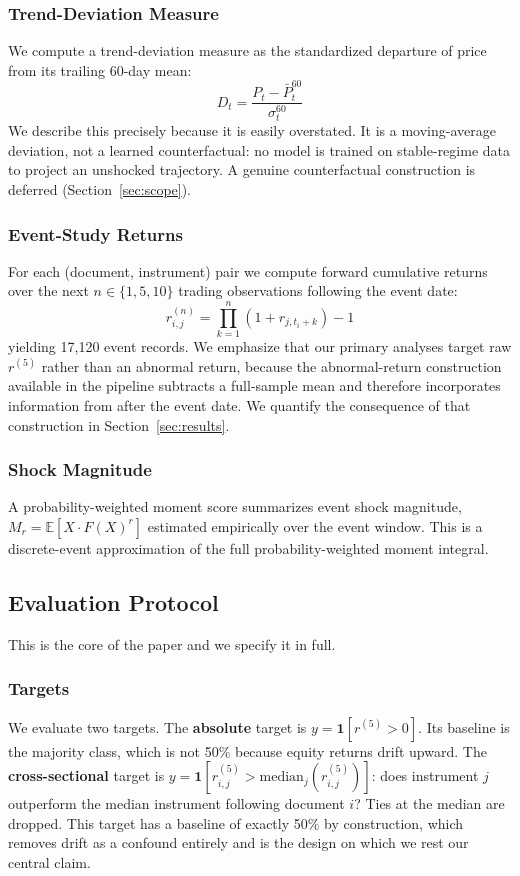 \documentclass[11pt]{article}
\begin{document}
\subsubsection{Trend-Deviation Measure}
We compute a trend-deviation measure as the standardized departure of price from its trailing 60-day mean:
\begin{equation}
D_t = \frac{P_t - \bar{P}^{60}_t}{\sigma^{60}_t}
\label{eq:cptmf}
\end{equation}
We describe this precisely because it is easily overstated. It is a moving-average deviation, not a learned counterfactual: no model is trained on stable-regime data to project an unshocked trajectory. A genuine counterfactual construction is deferred (Section~\ref{sec:scope}).

\subsubsection{Event-Study Returns}
For each (document, instrument) pair we compute forward cumulative returns over the next $n \in \{1, 5, 10\}$ trading observations following the event date:
\begin{equation}
r^{(n)}_{i,j} = \prod_{k=1}^{n}(1 + r_{j, t_i + k}) - 1
\label{eq:fwd}
\end{equation}
yielding 17{,}120 event records. We emphasize that our primary analyses target raw $r^{(5)}$ rather than an abnormal return, because the abnormal-return construction available in the pipeline subtracts a full-sample mean and therefore incorporates information from after the event date. We quantify the consequence of that construction in Section~\ref{sec:results}.

\subsubsection{Shock Magnitude}
A probability-weighted moment score summarizes event shock magnitude, $M_r = \mathbb{E}[X \cdot F(X)^r]$ estimated empirically over the event window. This is a discrete-event approximation of the full probability-weighted moment integral.

\subsection{Evaluation Protocol}

This is the core of the paper and we specify it in full.

\subsubsection{Targets}
We evaluate two targets. The \textbf{absolute} target is $y = \mathbf{1}[r^{(5)} > 0]$. Its baseline is the majority class, which is not 50\% because equity returns drift upward. The \textbf{cross-sectional} target is $y = \mathbf{1}[r^{(5)}_{i,j} > \text{median}_j(r^{(5)}_{i,j})]$: does instrument $j$ outperform the median instrument following document $i$? Ties at the median are dropped. This target has a baseline of exactly 50\% by construction, which removes drift as a confound entirely and is the design on which we rest our central claim.
\end{document}
